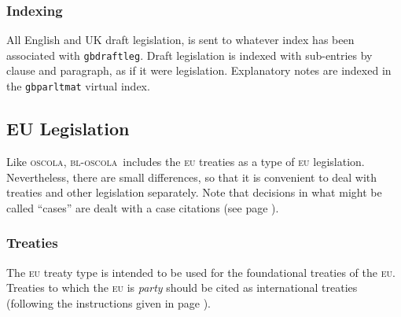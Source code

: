\documentclass[a4paper,
               11pt,
	       DIV=1,			   
	       footinclude=false]
	      {scrartcl}
\newcommand{\oscola}{\textsc{bl-oscola}}
\newcommand{\oscolashort}{\textsc{oscola}\nocite{oscola}}
\begin{document}
\subsubsection{Indexing}

{\sloppy All English and UK draft legislation, is sent to whatever index has been
associated with \verb|gbdraftleg|. Draft legislation is indexed with
sub-entries by clause and paragraph, as if it were
legislation. Explanatory notes are indexed in the \texttt{gbparltmat}
virtual index.}

\subsection{EU Legislation}

Like \oscolashort, \oscola\ includes the \textsc{eu} treaties as a
type of \textsc{eu} legislation. Nevertheless, there are small
differences, so that it is convenient to deal with treaties and other
legislation separately. Note that decisions in what might be called
\enquote{cases} are dealt with a case citations (see page
\pageref{eudecisioncases}).

\subsubsection{Treaties}

The \textsc{eu} treaty type is intended to be used for the
foundational treaties of the \textsc{eu}. Treaties to which the
\textsc{eu} is \emph{party} should be cited as international treaties
(following the instructions given in page \pageref{piltreaties}).
\end{document}

